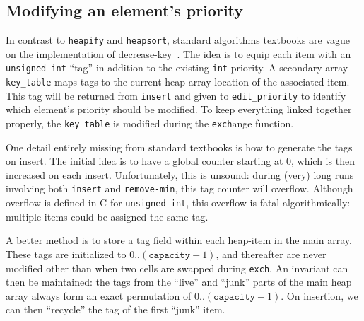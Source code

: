 \subsection{Modifying an element's priority}

In contrast to \texttt{heapify} and \texttt{heapsort}, standard algorithms textbooks are vague on the implementation of decrease-key~\cite{CLRS,Sedgewick}.  The idea is to equip each item with an \texttt{unsigned int} ``tag'' in addition to the existing \texttt{int} priority. A secondary array \texttt{key\_table} maps tags to the current heap-array location of the associated item.  This tag will be returned from \texttt{insert} and given to \texttt{edit\_priority} to identify which element's priority should be modified.  To keep everything linked together properly, the \texttt{key\_table} is modified during the \texttt{exch}ange function.

One detail entirely missing from standard textbooks is how to generate the tags on insert.  The initial idea is to have a global counter starting at 0, which is then increased on each insert.  Unfortunately, this is unsound: during (very) long runs involving both \texttt{insert} and \texttt{remove-min}, this tag counter will overflow.  Although overflow is defined in C for \texttt{unsigned int}, this overflow is fatal algorithmically: multiple items could be assigned the same tag.

A better method is to store a tag field within each heap-item in the main array.  These tags are initialized to $0..(\texttt{capacity}-1)$, and thereafter are never modified other than when two cells are swapped during \texttt{exch}.  An invariant can then be maintained: the tags from the ``live'' and ``junk'' parts of the main heap array always form an exact permutation of $0..(\texttt{capacity}-1)$.  On insertion, we can then ``recycle'' the tag of the first ``junk'' item.

